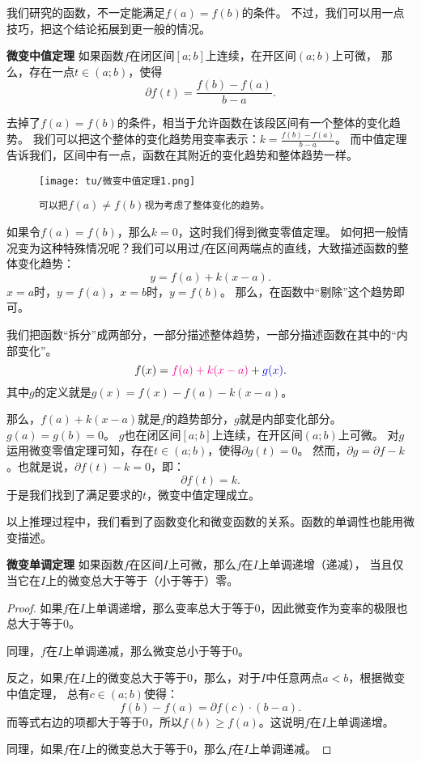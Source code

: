 \documentclass[12pt,UTF8]{ctexbook}
\begin{document}
我们研究的函数，不一定能满足$f(a) = f(b)$的条件。
不过，我们可以用一点技巧，把这个结论拓展到更一般的情况。

\begin{tm}{\textbf{微变中值定理}}\label{tm:2-4-10}
    如果函数$f$在闭区间$[a; b]$上连续，在开区间$(a; b)$上可微，
    那么，存在一点$t\in(a; b)$，使得
    $$ \partial f(t) = \frac{f(b) - f(a)}{b - a}.$$
\end{tm}

去掉了$f(a) = f(b)$的条件，相当于允许函数在该段区间有一个整体的变化趋势。
我们可以把这个整体的变化趋势用变率表示：$k = \frac{f(b) - f(a)}{b - a}$。
而中值定理告诉我们，区间中有一点，函数在其附近的变化趋势和整体趋势一样。

\begin{figure}[h]
    \centering
    \texttt{[image: tu/微变中值定理1.png]}    
    \caption*{\texttt{可以把}$f(a) \neq f(b)$\texttt{视为考虑了整体变化的趋势。}}
\end{figure}

如果令$f(a) = f(b)$，那么$k=0$，这时我们得到微变零值定理。
如何把一般情况变为这种特殊情况呢？我们可以用过$f$在区间两端点的直线，大致描述函数的整体变化趋势：
$$ y = f(a) + k(x - a).$$
$x = a$时，$y = f(a)$，$x = b$时，$y = f(b)$。
那么，在函数中“剔除”这个趋势即可。

我们把函数“拆分”成两部分，一部分描述整体趋势，一部分描述函数在其中的“内部变化”。
$$ f(x) = {\color{magenta} f(a) + k(x - a)} + {\color{blue} g(x)}. $$
其中$g$的定义就是$g(x) = f(x) - f(a) - k(x - a)$。

那么，$f(a) + k(x - a)$就是$f$的趋势部分，$g$就是内部变化部分。$g(a) = g(b) = 0$。
$g$也在闭区间$[a; b]$上连续，在开区间$(a; b)$上可微。
对$g$运用微变零值定理可知，存在$t\in(a;b)$，使得$\partial g(t) = 0$。
然而，$\partial g = \partial f - k$。也就是说，$ \partial f(t) - k = 0$，即：
$$ \partial f(t) = k.$$
于是我们找到了满足要求的$t$，微变中值定理成立。

以上推理过程中，我们看到了函数变化和微变函数的关系。函数的单调性也能用微变描述。
\begin{tm}{\textbf{微变单调定理}}\label{tm:2-4-20}
    如果函数$f$在区间$I$上可微，那么$f$在$I$上单调递增（递减），
    当且仅当它在$I$上的微变总大于等于（小于等于）零。
\end{tm}

\begin{proof}
    如果$f$在$I$上单调递增，那么变率总大于等于$0$，因此微变作为变率的极限也总大于等于$0$。
    
    同理，$f$在$I$上单调递减，那么微变总小于等于$0$。

    反之，如果$f$在$I$上的微变总大于等于$0$，那么，对于$I$中任意两点$a < b$，根据微变中值定理，
    总有$c\in(a; b)$使得：
    $$f(b) - f(a) = \partial f(c) \cdot (b - a).$$
    而等式右边的项都大于等于$0$，所以$f(b) \geqslant f(a)$。这说明$f$在$I$上单调递增。
    
    同理，如果$f$在$I$上的微变总大于等于$0$，那么$f$在$I$上单调递减。
\end{proof}
\end{document}
